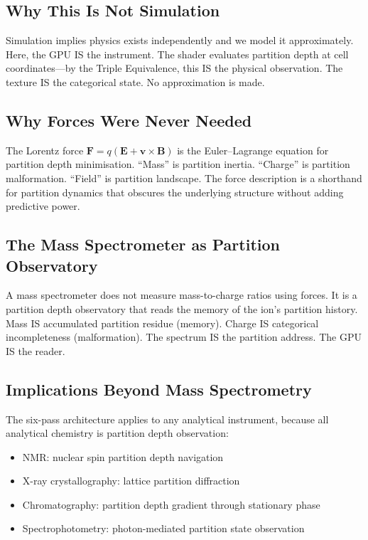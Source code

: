 \documentclass[11pt,twocolumn,a4paper]{article}
\theoremstyle{definition}
\theoremstyle{remark}
\begin{document}
\subsection{Why This Is Not Simulation}

Simulation implies physics exists independently and we model it approximately. Here, the GPU IS the instrument. The shader evaluates partition depth at cell coordinates---by the Triple Equivalence, this IS the physical observation. The texture IS the categorical state. No approximation is made.

\subsection{Why Forces Were Never Needed}

The Lorentz force $\mathbf{F} = q(\mathbf{E} + \mathbf{v}\times\mathbf{B})$ is the Euler--Lagrange equation for partition depth minimisation. ``Mass'' is partition inertia. ``Charge'' is partition malformation. ``Field'' is partition landscape. The force description is a shorthand for partition dynamics that obscures the underlying structure without adding predictive power.

\subsection{The Mass Spectrometer as Partition Observatory}

A mass spectrometer does not measure mass-to-charge ratios using forces. It is a partition depth observatory that reads the memory of the ion's partition history. Mass IS accumulated partition residue (memory). Charge IS categorical incompleteness (malformation). The spectrum IS the partition address. The GPU IS the reader.

\subsection{Implications Beyond Mass Spectrometry}

The six-pass architecture applies to any analytical instrument, because all analytical chemistry is partition depth observation:
\begin{itemize}[nosep]
\item NMR: nuclear spin partition depth navigation
\item X-ray crystallography: lattice partition diffraction
\item Chromatography: partition depth gradient through stationary phase
\item Spectrophotometry: photon-mediated partition state observation
\end{itemize}
\end{document}
